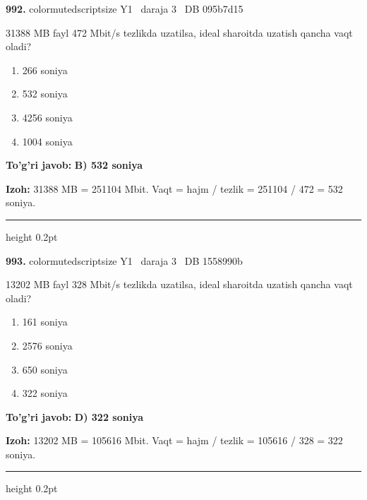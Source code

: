\documentclass[10pt,a4paper,oneside]{article}
\begin{document}
\noindent\textbf{\color{ink}992.}  {color{muted}scriptsize Y1 \textbullet\ daraja 3 \textbullet\ DB 095b7d15}
\par
31388 MB fayl 472 Mbit/s tezlikda uzatilsa, ideal sharoitda uzatish qancha vaqt oladi?
\begin{enumerate}[label=\Alph*),leftmargin=9mm]
\item 266 soniya
\item 532 soniya
\item 4256 soniya
\item 1004 soniya
\end{enumerate}
\begin{tcolorbox}[enhanced,breakable,colback=teal!4,colframe=teal!50!black,boxrule=0.5pt,arc=1.1mm,left=3mm,right=3mm,top=1.7mm,bottom=1.7mm,before skip=2mm,after skip=2mm]
\textbf{\color{teal}To'g'ri javob:} \textbf{B) 532 soniya}
\par\smallskip
\textbf{Izoh:} 31388 MB = 251104 Mbit. Vaqt = hajm / tezlik = 251104 / 472 = 532 soniya.
\end{tcolorbox}
\vspace{2mm}\hrule height 0.2pt \vspace{3mm}

\noindent\textbf{\color{ink}993.}  {color{muted}scriptsize Y1 \textbullet\ daraja 3 \textbullet\ DB 1558990b}
\par
13202 MB fayl 328 Mbit/s tezlikda uzatilsa, ideal sharoitda uzatish qancha vaqt oladi?
\begin{enumerate}[label=\Alph*),leftmargin=9mm]
\item 161 soniya
\item 2576 soniya
\item 650 soniya
\item 322 soniya
\end{enumerate}
\begin{tcolorbox}[enhanced,breakable,colback=teal!4,colframe=teal!50!black,boxrule=0.5pt,arc=1.1mm,left=3mm,right=3mm,top=1.7mm,bottom=1.7mm,before skip=2mm,after skip=2mm]
\textbf{\color{teal}To'g'ri javob:} \textbf{D) 322 soniya}
\par\smallskip
\textbf{Izoh:} 13202 MB = 105616 Mbit. Vaqt = hajm / tezlik = 105616 / 328 = 322 soniya.
\end{tcolorbox}
\vspace{2mm}\hrule height 0.2pt \vspace{3mm}
\end{document}

